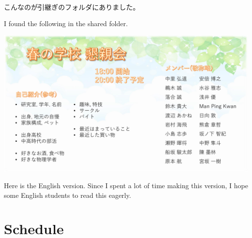 \documentclass[unicode,a4paper,11pt]{ltjsarticle}
\begin{document}
こんなのが引継ぎのフォルダにありました。

I found the following in the shared folder.

\begin{center}
  \includegraphics[width=1.0\linewidth]{konshinkai.pdf}
\end{center}


\clearpage

\setcounter{section}{0}

Here is the English version. Since I spent a lot of time making this version, I hope some English students to read this eagerly.

\label{eng_page}

\section{Schedule}
\end{document}
